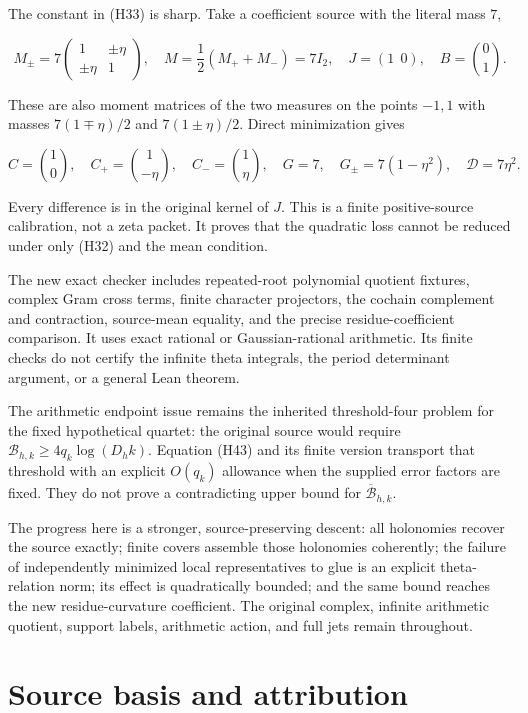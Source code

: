 \documentclass[
]{article}
\begin{document}
The constant in (H33) is sharp. Take a coefficient source with the
literal mass \(7\),

\[
 M_\pm=7\begin{pmatrix}1&\pm\eta\\\pm\eta&1\end{pmatrix},
 \quad M=\frac12(M_++M_-)=7I_2,\quad
 J=(1\ \ 0),\quad B=\binom01.
 \tag{H65}
\]

These are also moment matrices of the two measures on the points
\(-1,1\) with masses \(7(1\mp\eta)/2\) and \(7(1\pm\eta)/2\). Direct
minimization gives

\[
 C=\binom10,\quad C_+=\binom1{-\eta},\quad
 C_-=\binom1{\eta},\quad G=7,\quad
 G_\pm=7(1-\eta^2),\quad\mathscr D=7\eta^2.
 \tag{H66}
\]

Every difference is in the original kernel of \(J\). This is a finite
positive-source calibration, not a zeta packet. It proves that the
quadratic loss cannot be reduced under only (H32) and the mean
condition.

The new exact checker includes repeated-root polynomial quotient
fixtures, complex Gram cross terms, finite character projectors, the
cochain complement and contraction, source-mean equality, and the
precise residue-coefficient comparison. It uses exact rational or
Gaussian-rational arithmetic. Its finite checks do not certify the
infinite theta integrals, the period determinant argument, or a general
Lean theorem.

The arithmetic endpoint issue remains the inherited threshold-four
problem for the fixed hypothetical quartet: the original source would
require \(\mathcal B_{h,k}\geq4q_k\log(D_hk)\). Equation (H43) and its
finite version transport that threshold with an explicit \(O(q_k)\)
allowance when the supplied error factors are fixed. They do not prove a
contradicting upper bound for \(\overline{\mathcal B}_{h,k}\).

The progress here is a stronger, source-preserving descent: all
holonomies recover the source exactly; finite covers assemble those
holonomies coherently; the failure of independently minimized local
representatives to glue is an explicit theta-relation norm; its effect
is quadratically bounded; and the same bound reaches the new
residue-curvature coefficient. The original complex, infinite arithmetic
quotient, support labels, arithmetic action, and full jets remain
throughout.

\section{Source basis and
attribution}\label{source-basis-and-attribution}
\end{document}
